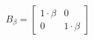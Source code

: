 \documentclass[preview]{standalone}
\begin{document}
\begin{align*}
B_{\beta} = \begin{bmatrix} 1\cdot  \beta & 0 \\ 0 & 1 \cdot \beta\end{bmatrix}
\end{align*}
\end{document}
